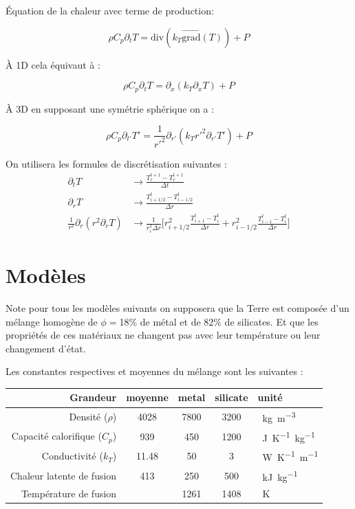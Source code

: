 \documentclass[10pt,a4paper]{article}
\numberwithin{equation}{section}
\begin{document}
Équation de la chaleur avec terme de production:

\begin{equation}
\rho C_p \partial_t T = \textrm{div} ( k_{T} \vec{\textrm{grad}}(T))  + P
\end{equation}

À 1D cela équivaut à :

\begin{equation}
\rho C_p \partial_t T = \partial_x ( k_{T} \partial_x T)  + P
\end{equation}


 À 3D en supposant une symétrie sphérique on a :

\begin{equation}
\rho C_p \partial_{t'} T' = \frac{1}{r'^2} \partial_{r'} ( k_{T} {r'}^2 \partial_{r'} T')  + P
\end{equation}





On utilisera les formules de discrétisation suivantes :
\begin{align}
\partial_t T &\rightarrow  \frac{T^{t+1}_r - T^{t+1}_r}{\Delta t}\\
\partial_r T &\rightarrow  \frac{T^t_{i+1/2} - T^{t}_{i-1/2}}{\Delta r} \\
\frac{1}{r^2}\partial_r (r^2 \partial_r T ) &\rightarrow \frac{1}{r^2_i \Delta r}\Big [ r^2_{i+1/2}\frac{T^t_{i+1} - T^{t}_{i}}{\Delta r} + r^2_{i-1/2}\frac{T^t_{i-1} - T^{t}_{i}}{\Delta r} \Big]
\end{align}

\section{Modèles}

Note pour tous les modèles suivants on supposera que la Terre est composée d'un mélange homogène de $\phi = $18\% de métal et de 82\% de silicates. Et que les propriétés de ces matériaux ne changent pas avec leur température ou leur changement d'état.

Les constantes respectives et moyennes du mélange sont les suivantes :
\tabulinesep=0.3mm
\begin{center}
  \begin{tabu}{ r | c c c l}
    Grandeur & moyenne & metal & silicate & unité\\ \hline
    Densité ($\rho$) & 4028 & 7800 &  3200 & \SI{}{kg.m^{-3}}\\ \hline
    Capacité calorifique ($C_p$) & 939 & 450 & 1200 &  \SI{}{J.K^{-1}.kg^{-1}} \\ \hline
    Conductivité ($k_T$)& 11.48 & 50 & 3 & \SI{}{W.K^{-1}.m^{-1}}  \\ \hline    
    Chaleur latente de fusion & 413 & 250 & 500 & \SI{}{kJ.kg^{-1}}\\ \hline
    Température de fusion & & 1261 & 1408 & \SI{}{K}\\ \hline

  \end{tabu}
\end{center}
\end{document}
